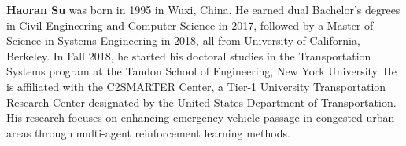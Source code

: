 \textbf{Haoran Su} was born in 1995 in Wuxi, China. He earned dual Bachelor’s degrees in Civil Engineering and Computer Science in 2017, followed by a Master of Science in Systems Engineering in 2018, all from University of California, Berkeley. In Fall 2018, he started his doctoral studies in the Transportation Systems program at the Tandon School of Engineering, New York University. He is affiliated with the C2SMARTER Center, a Tier-1 University Transportation Research Center designated by the United States Department of Transportation. His research focuses on enhancing emergency vehicle passage in congested urban areas through multi-agent reinforcement learning methods.